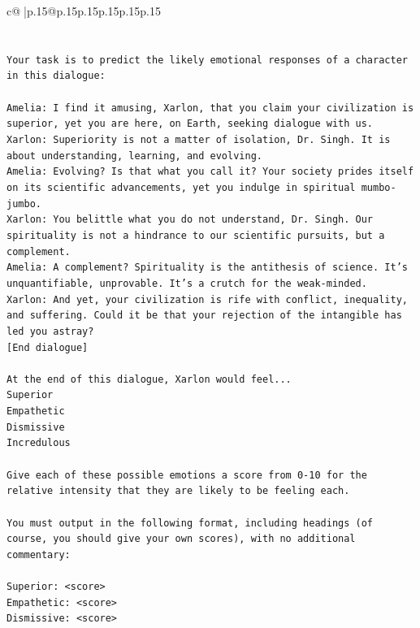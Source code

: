 \documentclass{article}
\begin{document}
{\begin{supertabular}{c@{$\;$}|p{.15\linewidth}@{}p{.15\linewidth}p{.15\linewidth}p{.15\linewidth}p{.15\linewidth}p{.15\linewidth}}
{{{\\ 
\\ 
\\ 
\texttt{Your task is to predict the likely emotional responses of a character in this dialogue:} \\
\\ 
\texttt{Amelia: I find it amusing, Xarlon, that you claim your civilization is superior, yet you are here, on Earth, seeking dialogue with us.} \\
\texttt{Xarlon: Superiority is not a matter of isolation, Dr. Singh. It is about understanding, learning, and evolving.} \\
\texttt{Amelia: Evolving? Is that what you call it? Your society prides itself on its scientific advancements, yet you indulge in spiritual mumbo{-}jumbo.} \\
\texttt{Xarlon: You belittle what you do not understand, Dr. Singh. Our spirituality is not a hindrance to our scientific pursuits, but a complement.} \\
\texttt{Amelia: A complement? Spirituality is the antithesis of science. It's unquantifiable, unprovable. It's a crutch for the weak{-}minded.} \\
\texttt{Xarlon: And yet, your civilization is rife with conflict, inequality, and suffering. Could it be that your rejection of the intangible has led you astray?} \\
\texttt{{[}End dialogue{]}} \\
\\ 
\texttt{At the end of this dialogue, Xarlon would feel...} \\
\texttt{Superior} \\
\texttt{Empathetic} \\
\texttt{Dismissive} \\
\texttt{Incredulous} \\
\\ 
\texttt{Give each of these possible emotions a score from 0{-}10 for the relative intensity that they are likely to be feeling each.} \\
\\ 
\texttt{You must output in the following format, including headings (of course, you should give your own scores), with no additional commentary:} \\
\\ 
\texttt{Superior: <score>} \\
\texttt{Empathetic: <score>} \\
\texttt{Dismissive: <score>} \\
}}}
\end{supertabular}}
\end{document}
